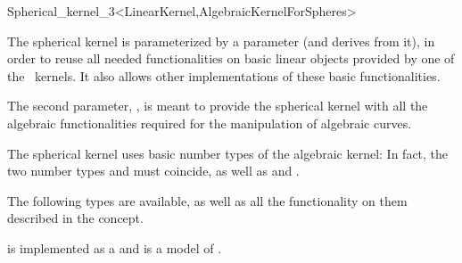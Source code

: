 \begin{ccRefClass}{Spherical_kernel_3<LinearKernel,AlgebraicKernelForSpheres>}


\ccIsModel


\ccParameters

The spherical kernel is parameterized by a  parameter
(and derives from it), in order to reuse all needed functionalities on
basic linear objects provided by one of the \cgal\ kernels. It also
allows other implementations of these basic functionalities.

The second parameter, , is meant to provide the
spherical kernel with all the algebraic functionalities required for the
manipulation of algebraic curves. 

\ccInheritsFrom


\ccTypes

\ccThreeToTwo

The spherical kernel uses basic number types of the algebraic kernel:
In fact, the two number types  and
 must coincide, as well as
 and .

The following types are available, as well as all the functionality on
them described in the  concept. 

\ccGlue
{}
\ccGlue
{}
\ccGlue
{}

 is implemented as a 
 and is a model 
of .

\ccSeeAlso

\\
\\

\end{ccRefClass}
